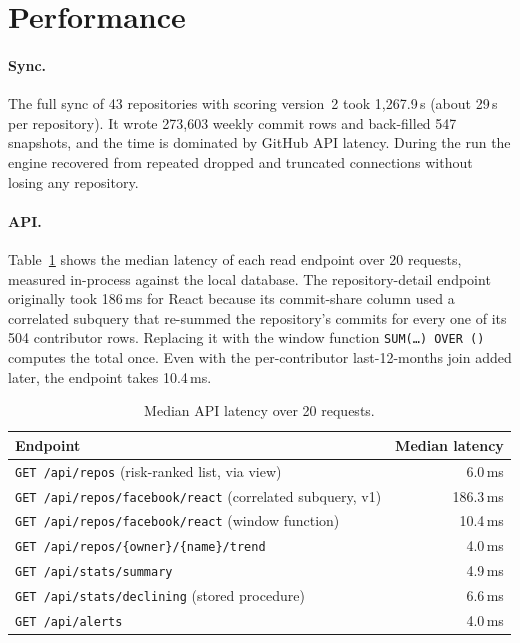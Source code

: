 \documentclass[11pt,a4paper]{report}
\begin{document}
\section{Performance}

\paragraph{Sync.} The full sync of 43 repositories with scoring version~2
took 1,267.9\,s (about 29\,s per repository). It wrote 273,603 weekly commit
rows and back-filled 547 snapshots, and the time is dominated by GitHub API
latency. During the run the engine recovered from repeated dropped and
truncated connections without losing any repository.

\paragraph{API.} Table~\ref{tab:latency} shows the median latency of each read
endpoint over 20 requests, measured in-process against the local database.
The repository-detail endpoint originally took 186\,ms for React because its
commit-share column used a correlated subquery that re-summed the repository's
commits for every one of its 504 contributor rows. Replacing it with the
window function \texttt{SUM(\ldots) OVER ()} computes the total once. Even with
the per-contributor last-12-months join added later, the endpoint takes
10.4\,ms.

\begin{table}[H]
\centering
\caption{Median API latency over 20 requests.}
\label{tab:latency}
\small
\begin{tabular}{lr}
\toprule
\textbf{Endpoint} & \textbf{Median latency} \\
\midrule
\texttt{GET /api/repos} (risk-ranked list, via view) & 6.0\,ms \\
\texttt{GET /api/repos/facebook/react} (correlated subquery, v1) & 186.3\,ms \\
\texttt{GET /api/repos/facebook/react} (window function) & 10.4\,ms \\
\texttt{GET /api/repos/\{owner\}/\{name\}/trend} & 4.0\,ms \\
\texttt{GET /api/stats/summary} & 4.9\,ms \\
\texttt{GET /api/stats/declining} (stored procedure) & 6.6\,ms \\
\texttt{GET /api/alerts} & 4.0\,ms \\
\bottomrule
\end{tabular}
\end{table}
\end{document}
